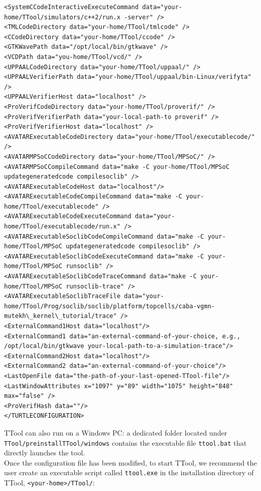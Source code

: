 \documentclass{llncs}
\begin{document}
\begin{landscape}
\begin{lstlisting}
<SystemCCodeInteractiveExecuteCommand data="your-home/TTool/simulators/c++2/run.x -server" />
<TMLCodeDirectory data="your-home/TTool/tmlcode" />
<CCodeDirectory data="your-home/TTool/ccode" />
<GTKWavePath data="/opt/local/bin/gtkwave" />
<VCDPath data="you-home/TTool/vcd/" />
<UPPAALCodeDirectory data="your-home/TTool/uppaal/" />
<UPPAALVerifierPath data="your-home/TTool/uppaal/bin-Linux/verifyta" />
<UPPAALVerifierHost data="localhost" />
<ProVerifCodeDirectory data="your-home/TTool/proverif/" />
<ProVerifVerifierPath data="your-local-path-to proverif" />
<ProVerifVerifierHost data="localhost" />
<AVATARExecutableCodeDirectory data="your-home/TTool/executablecode/" />
<AVATARMPSoCCodeDirectory data="your-home/TTool/MPSoC/" />
<AVATARMPSoCCompileCommand data="make -C your-home/TTool/MPSoC updategeneratedcode compilesoclib" />
<AVATARExecutableCodeHost data="localhost"/>
<AVATARExecutableCodeCompileCommand data="make -C your-home/TTool/executablecode" />
<AVATARExecutableCodeExecuteCommand data="your-home/TTool/executablecode/run.x" />
<AVATARExecutableSoclibCodeCompileCommand data="make -C your-home/TTool/MPSoC updategeneratedcode compilesoclib" />
<AVATARExecutableSoclibCodeExecuteCommand data="make -C your-home/TTool/MPSoC runsoclib" />
<AVATARExecutableSoclibCodeTraceCommand data="make -C your-home/TTool/MPSoC runsoclib-trace" />
<AVATARExecutableSoclibTraceFile data="your-home/TTool/Prog/soclib/soclib/platform/topcells/caba-vgmn-mutekh\_kernel\_tutorial/trace" />
<ExternalCommand1Host data="localhost"/>
<ExternalCommand1 data="an-external-command-of-your-choice, e.g., /opt/local/bin/gtkwave your-local-path-to-a-simulation-trace"/>
<ExternalCommand2Host data="localhost"/>
<ExternalCommand2 data="an-external-command-of-your-choice"/>
<LastOpenFile data="the-path-of-your-last-opened-TTool-file"/>
<LastWindowAttributes x="1097" y="89" width="1075" height="848" max="false" />
<ProVerifHash data=""/>
</TURTLECONFIGURATION>
\end{lstlisting}
\end{landscape}
%
\noindent
TTool can also run on a Windows PC: a dedicated folder located under \texttt{TTool/preinstallTTool/windows} contains the
executable file \texttt{ttool.bat} that directly launches the tool.\\
%
Once the configuration file has been modified, to start TTool, we recommend the user create an executable script
called \texttt{ttool.exe} in the installation directory of TTool, \texttt{<your-home>/TTool/}:\\
%
\end{document}
